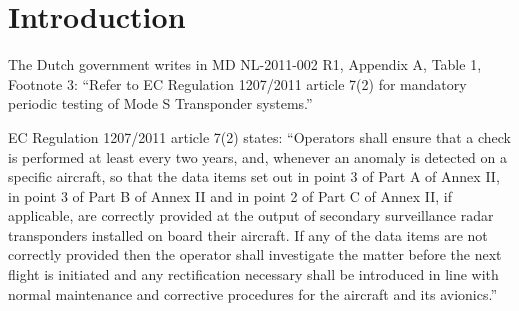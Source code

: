 \documentclass[a4paper]{article}
\begin{document}
\section{Introduction}
The Dutch government writes in MD NL-2011-002 R1\cite{NL_2011_002_R1}, Appendix A, Table 1, Footnote 3: ``Refer to EC Regulation 1207/2011 article 7(2) for mandatory periodic testing of Mode S Transponder systems.''

EC Regulation 1207/2011\cite{EC_1207_2011} article 7(2) states: ``Operators shall ensure that a check is performed at least every two years, and, whenever an anomaly is detected on a specific aircraft, so that the data items set out in point 3 of Part A of Annex II, in point 3 of Part B of Annex II and in point 2 of Part C of Annex II, if applicable, are correctly provided at the output of secondary surveillance radar transponders installed on board their aircraft. If any of the data items are not correctly provided then the operator shall investigate the matter before the next flight is initiated and any rectification necessary shall be introduced in line with normal maintenance and corrective procedures for the aircraft and its avionics.''




\end{document}
